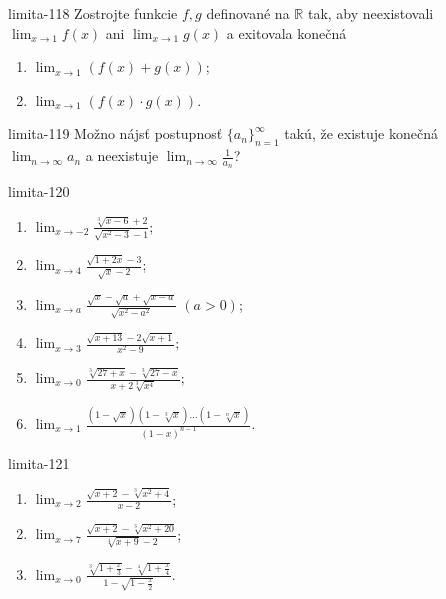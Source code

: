 \begin{defproblem}{limita-118}
Zostrojte funkcie $f,g$ definované na $\mathbb{R}$ tak, aby neexistovali $\lim_{x \rightarrow 1} f(x)$ ani $\lim_{x \rightarrow 1} g(x)$ a exitovala konečná
\begin{multicols}{2}
\begin{enumerate}
    \item $\lim_{{x \rightarrow 1}} (f(x)+g(x))$;
    \item $\lim_{{x \rightarrow 1}} (f(x) \cdot g(x))$.
\end{enumerate}
\end{multicols}
\end{defproblem}

\begin{defproblem}{limita-119}
Možno nájsť postupnosť ${\{a_n\}}_{n=1}^\infty$ takú, že existuje konečná $\lim_{n \rightarrow \infty} a_n$ a neexistuje $\lim_{n \rightarrow \infty} \frac{1}{a_n}$?
\end{defproblem}

\begin{defproblem}{limita-120}
\begin{multicols}{2}
\begin{enumerate}
    \item $\lim_{{x \rightarrow -2}} \frac{\sqrt[3]{x-6}+2}{\sqrt{x^2-3}-1}$;
    \item $\lim_{{x \rightarrow 4}} \frac{\sqrt{1+2x}-3}{\sqrt{x}-2}$;
    \item $\lim_{{x \rightarrow a}} \frac{\sqrt{x}-\sqrt{a}+\sqrt{x-a}}{\sqrt{x^2-a^2}}$ $(a>0)$;
    \item $\lim_{{x \rightarrow 3}} \frac{\sqrt{x+13}-2\sqrt{x+1}}{x^2-9}$;
    \item $\lim_{{x \rightarrow 0}} \frac{\sqrt[3]{27+x}-\sqrt[3]{27-x}}{x+2\sqrt[3]{x^4}}$;
    \item $\lim_{{x \rightarrow 1}} \frac{(1-\sqrt{x})(1-\sqrt[3]{x})...(1-\sqrt[n]{x})}{(1-x)^{n-1}}$.
\end{enumerate}
\end{multicols}
\end{defproblem}

\begin{defproblem}{limita-121}
\begin{enumerate}
\item $\lim_{x \rightarrow 2} \frac{\sqrt{x+2}-\sqrt[3]{x^2+4}}{x-2}$;
\item  $\lim_{x \rightarrow 7} \frac{\sqrt{x+2}-\sqrt[3]{x^2+20}}{\sqrt[4]{x+9}-2}$;
\item  $\lim_{x \rightarrow 0} \frac{\sqrt[3]{1+\frac{x}{3}}-\sqrt[4]{1+\frac{x}{4}}}{1-\sqrt{1-\frac{x}{2}}}$.
\end{enumerate}
\end{defproblem}

